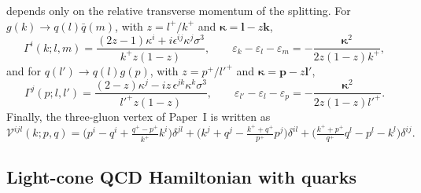 \documentclass[11pt,a4paper]{article}
\numberwithin{equation}{section}
\newcommand{\eps}{\varepsilon}
\newcommand{\Gam}{\Gamma}
\newcommand{\Vg}{\mathcal{V}}
\begin{document}
depends only on the relative transverse momentum of the splitting. For $g(k)\to q(l)\bar q(m)$,
with $z=l^{+}/k^{+}$ and $\bm\kappa=\bm l-z\bm k$,
\begin{equation}
\Gam^{i}(k;l,m)=\frac{(2z-1)\kappa^{i}+i\epsilon^{ij}\kappa^{j}\sigma^{3}}{k^{+}z(1-z)},
\qquad
\eps_{k}-\eps_{l}-\eps_{m}=-\frac{\bm\kappa^{2}}{2z(1-z)k^{+}} ,
\label{eq:kappa}
\end{equation}
and for $q(l')\to q(l)g(p)$, with $z=p^{+}/l'^{+}$ and $\bm\kappa=\bm p-z\bm l'$,
\begin{equation}
\Gam^{j}(p;l,l')=\frac{(2-z)\kappa^{j}-iz\,\epsilon^{jk}\kappa^{k}\sigma^{3}}{l'^{+}z(1-z)},
\qquad
\eps_{l'}-\eps_{l}-\eps_{p}=-\frac{\bm\kappa^{2}}{2z(1-z)l'^{+}} .
\label{eq:kappaq}
\end{equation}
Finally, the three-gluon vertex of Paper~I is written as
\begin{equation}
\Vg^{ijl}(k;p,q)=\Big(p^{i}-q^{i}+\tfrac{q^{+}-p^{+}}{k^{+}}k^{i}\Big)\delta^{jl}
+\Big(k^{j}+q^{j}-\tfrac{k^{+}+q^{+}}{p^{+}}p^{j}\Big)\delta^{il}
+\Big(\tfrac{k^{+}+p^{+}}{q^{+}}q^{l}-p^{l}-k^{l}\Big)\delta^{ij}.
\label{eq:Vggg}
\end{equation}

\subsection{Light-cone QCD Hamiltonian with quarks}
\label{sec:ham}
\end{document}
